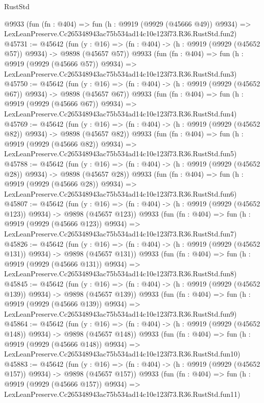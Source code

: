 \begin{lexlean}{RustStd}
\begin{coremodule}
    @9933
    (fun (fn : @404) =>
    fun (h : @9919 (@9929 (@45666 @49)) @9934) =>
    LexLeanPreserve.Cc265348943ac75b534ad14c10e123f73.R36.RustStd.fun2)
@45731 := @45642
    (fun (y : @16) => (fn : @404) -> (h : @9919 (@9929 (@45652 @57)) @9934) -> @9898 (@45657 @57))
    @9933
    (fun (fn : @404) =>
    fun (h : @9919 (@9929 (@45666 @57)) @9934) =>
    LexLeanPreserve.Cc265348943ac75b534ad14c10e123f73.R36.RustStd.fun3)
@45750 := @45642
    (fun (y : @16) => (fn : @404) -> (h : @9919 (@9929 (@45652 @67)) @9934) -> @9898 (@45657 @67))
    @9933
    (fun (fn : @404) =>
    fun (h : @9919 (@9929 (@45666 @67)) @9934) =>
    LexLeanPreserve.Cc265348943ac75b534ad14c10e123f73.R36.RustStd.fun4)
@45769 := @45642
    (fun (y : @16) => (fn : @404) -> (h : @9919 (@9929 (@45652 @82)) @9934) -> @9898 (@45657 @82))
    @9933
    (fun (fn : @404) =>
    fun (h : @9919 (@9929 (@45666 @82)) @9934) =>
    LexLeanPreserve.Cc265348943ac75b534ad14c10e123f73.R36.RustStd.fun5)
@45788 := @45642
    (fun (y : @16) => (fn : @404) -> (h : @9919 (@9929 (@45652 @28)) @9934) -> @9898 (@45657 @28))
    @9933
    (fun (fn : @404) =>
    fun (h : @9919 (@9929 (@45666 @28)) @9934) =>
    LexLeanPreserve.Cc265348943ac75b534ad14c10e123f73.R36.RustStd.fun6)
@45807 := @45642
    (fun (y : @16) => (fn : @404) -> (h : @9919 (@9929 (@45652 @123)) @9934) -> @9898 (@45657 @123))
    @9933
    (fun (fn : @404) =>
    fun (h : @9919 (@9929 (@45666 @123)) @9934) =>
    LexLeanPreserve.Cc265348943ac75b534ad14c10e123f73.R36.RustStd.fun7)
@45826 := @45642
    (fun (y : @16) => (fn : @404) -> (h : @9919 (@9929 (@45652 @131)) @9934) -> @9898 (@45657 @131))
    @9933
    (fun (fn : @404) =>
    fun (h : @9919 (@9929 (@45666 @131)) @9934) =>
    LexLeanPreserve.Cc265348943ac75b534ad14c10e123f73.R36.RustStd.fun8)
@45845 := @45642
    (fun (y : @16) => (fn : @404) -> (h : @9919 (@9929 (@45652 @139)) @9934) -> @9898 (@45657 @139))
    @9933
    (fun (fn : @404) =>
    fun (h : @9919 (@9929 (@45666 @139)) @9934) =>
    LexLeanPreserve.Cc265348943ac75b534ad14c10e123f73.R36.RustStd.fun9)
@45864 := @45642
    (fun (y : @16) => (fn : @404) -> (h : @9919 (@9929 (@45652 @148)) @9934) -> @9898 (@45657 @148))
    @9933
    (fun (fn : @404) =>
    fun (h : @9919 (@9929 (@45666 @148)) @9934) =>
    LexLeanPreserve.Cc265348943ac75b534ad14c10e123f73.R36.RustStd.fun10)
@45883 := @45642
    (fun (y : @16) => (fn : @404) -> (h : @9919 (@9929 (@45652 @157)) @9934) -> @9898 (@45657 @157))
    @9933
    (fun (fn : @404) =>
    fun (h : @9919 (@9929 (@45666 @157)) @9934) =>
    LexLeanPreserve.Cc265348943ac75b534ad14c10e123f73.R36.RustStd.fun11)

\end{coremodule}
\end{lexlean}
